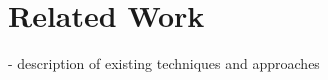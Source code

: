\chapter{Related Work}
\label{ch:related_work}


- description of existing techniques and approaches